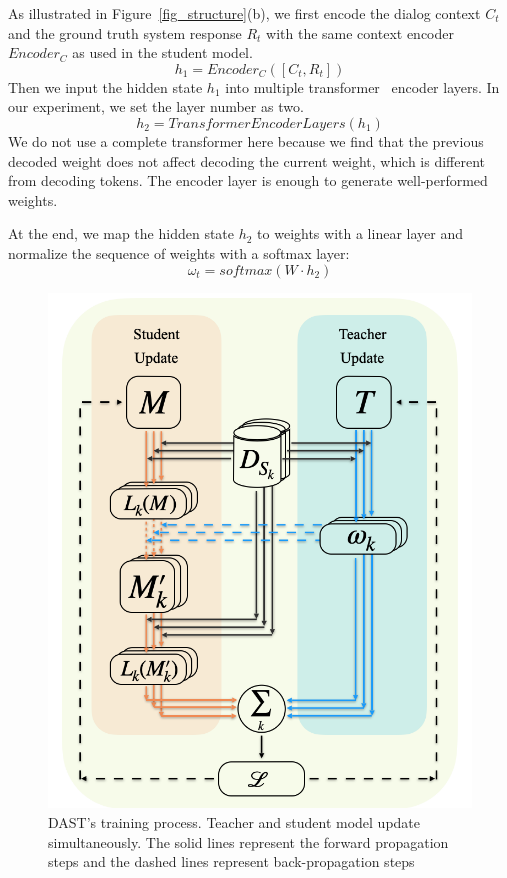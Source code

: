 \documentclass[letterpaper]{article} %
\begin{document}
As illustrated in Figure~\ref{fig_structure}(b), we first encode the dialog context $C_t$ and the ground truth system response $R_t$ with the same context encoder $Encoder_C$ as used in the student model.
$$h_1=Encoder_C([C_t,R_t])$$
Then we input the hidden state $h_1$ into multiple transformer~\citep{vaswani2017attention} encoder layers. In our experiment, we set the layer number as two.
$$h_2=TransformerEncoderLayers(h_1)$$
We do not use a complete transformer here because we find that the previous decoded weight does not affect decoding the current weight, which is different from decoding tokens. The encoder layer is enough to generate well-performed weights.

At the end, we map the hidden state $h_2$ to weights with a linear layer and normalize the sequence of weights with a softmax layer:
$$\omega_t= softmax(W\cdot h_2)$$
    
    
                            \begin{figure}
                            \centering
                            \includegraphics[width=0.95\columnwidth]{figs/train0.png}
                            \caption{DAST's training process. Teacher and student model update simultaneously. The solid lines represent the forward propagation steps and the dashed lines represent back-propagation steps}
                            \label{fig_train}
                            \end{figure}
    
\end{document}
